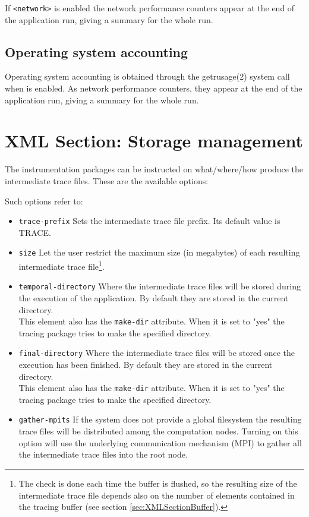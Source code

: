 If {\tt <network>} is enabled the network performance counters appear at the end of the application run, giving a summary for the whole run.

\subsection{Operating system accounting}\label{subsec:OperatingSystemAccounting}

Operating system accounting is obtained through the getrusage(2) system call when {\tt <resource-usage>} is enabled. As network performance counters, they appear at the end of the application run, giving a summary for the whole run.

\section{XML Section: Storage management}\label{sec:XMLSectionStorage}

The instrumentation packages can be instructed on what/where/how produce the intermediate trace files. These are the available options:



Such options refer to:

\begin{itemize}
 \item {\tt trace-prefix} Sets the intermediate trace file prefix. Its default value is {TRACE}.
 \item {\tt size} Let the user restrict the maximum size (in megabytes) of each resulting intermediate trace file\footnote{The check is done each time the buffer is flushed, so the resulting size of the intermediate trace file depends also on the number of elements contained in the tracing buffer (see section \ref{sec:XMLSectionBuffer}).}.
 \item {\tt temporal-directory} Where the intermediate trace files will be stored during the execution of the application. By default they are stored in the current directory.\\
  This element also has the {\tt make-dir} attribute. When it is set to "yes" the tracing package tries to make the specified directory.
 \item {\tt final-directory} Where the intermediate trace files will be stored once the execution has been finished. By default they are stored in the current directory.\\
  This element also has the {\tt make-dir} attribute. When it is set to "yes" the tracing package tries to make the specified directory.
 \item {\tt gather-mpits} If the system does not provide a global filesystem the resulting trace files will be distributed among the computation nodes. Turning on this option will use the underlying communication mechanism ({MPI}) to gather all the intermediate trace files into the root node.
\end{itemize}

